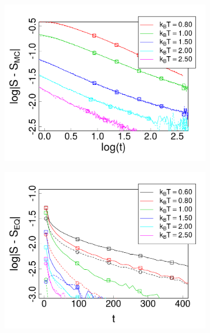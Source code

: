 \begin{figure}[h]
\centering
\begin{subfigure}[t]{0.49\textwidth}
	\centering
	\includegraphics[width=\textwidth]{Images/relax_op_25}
\end{subfigure}
\begin{subfigure}[t]{0.49\textwidth}
	\centering
	\includegraphics[width=\textwidth]{Images/relax_op_75_exp}

\end{subfigure}
\end{figure}
